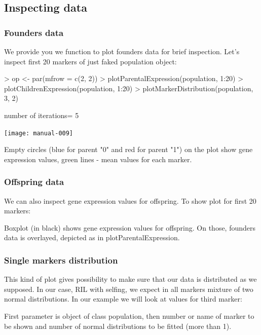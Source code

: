 \documentclass{article}
\begin{document}
\subsection{Inspecting data}
\subsubsection{Founders data}
We provide you we function to plot founders data for brief inspection. Let's inspect first 20 markers of just faked population object:

\begin{Schunk}
\begin{Sinput}
> op <- par(mfrow = c(2, 2))
> plotParentalExpression(population, 1:20)
> plotChildrenExpression(population, 1:20)
> plotMarkerDistribution(population, 3, 2)
\end{Sinput}
\begin{Soutput}
number of iterations= 5 
\end{Soutput}
\end{Schunk}
\texttt{[image: manual-009]}

{\noindent}Empty circles (blue for parent "0" and red for parent "1") on the plot show gene expression values, green lines - mean values for each marker.

\subsubsection{Offspring data}
We can also inspect gene expression values for offspring. To show plot for first 20 markers:


{\noindent}Boxplot (in black) shows gene expression values for offspring. On those, founders data is overlayed, depicted as in plotParentalExpression.
\newpage
\subsubsection{Single markers distribution}
This kind of plot gives possibility to make sure that our data is distributed as we supposed. In our case, RIL with selfing, we expect in all markers mixture of two normal distributions.
In our example we will look at values for third marker:


{\noindent}First parameter is object of class population, then number or name of marker to be shown and number of normal distributions to be fitted (more than 1).
\newpage
\end{document}
